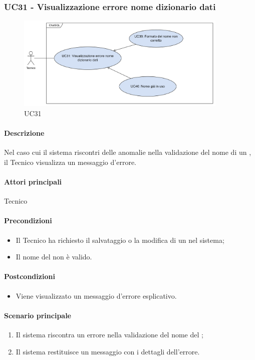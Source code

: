 \subsubsection{UC31 - Visualizzazione errore nome dizionario dati}\label{UC31}

\begin{figure}[H]
  \centering
  \includegraphics[width=0.90\textwidth]{assets/uc31.png}
  \caption{UC31}
\end{figure}

\paragraph*{Descrizione}
Nel caso cui il sistema riscontri delle anomalie nella validazione del nome di un , il Tecnico visualizza un messaggio d'errore.

\paragraph*{Attori principali}
Tecnico

\paragraph*{Precondizioni}
\begin{itemize}
  \item Il Tecnico ha richiesto il salvataggio o la modifica di un  nel sistema;
  \item Il nome del  non è valido.
\end{itemize}

\paragraph*{Postcondizioni}
\begin{itemize}
  \item Viene visualizzato un messaggio d'errore esplicativo.
\end{itemize}

\paragraph*{Scenario principale}
\begin{enumerate}
  \item Il sistema riscontra un errore nella validazione del nome del ;
  \item Il sistema restituisce un messaggio con i dettagli dell'errore.  
\end{enumerate}
